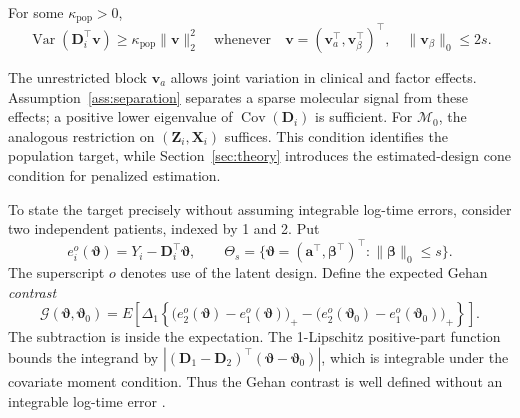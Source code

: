 \begin{assumption}
\label{ass:separation}
For some $\kappa_{\mathrm{pop}}>0$,
\begin{equation}
 \operatorname{Var}(\bm{D}_i^\top \bm{v})\ge\kappa_{\mathrm{pop}}\|\bm{v}\|_2^2
 \quad\text{whenever}\quad
 \bm{v}=(\bm{v}_a^\top,\bm{v}_\beta^\top)^\top,\quad \|\bm{v}_\beta\|_0\le 2s.
 \label{eq:population-separation}
\end{equation}
\end{assumption}
The unrestricted block $\bm{v}_a$ allows joint variation in clinical and factor effects. Assumption~\ref{ass:separation} separates a sparse molecular signal from these effects; a positive lower eigenvalue of $\operatorname{Cov}(\bm{D}_i)$ is sufficient. For $\mathcal M_0$, the analogous restriction on $(\bm{Z}_i,\bm{X}_i)$ suffices. This condition identifies the population target, while Section~\ref{sec:theory} introduces the estimated-design cone condition for penalized estimation.

To state the target precisely without assuming integrable log-time errors, consider two independent patients, indexed by 1 and 2. Put
\[
 e_i^o(\bm{\vartheta})=Y_i-\bm{D}_i^\top\bm{\vartheta},\qquad
 \Theta_s=\{\bm{\vartheta}=(\bm{a}^\top,\bm{\beta}^\top)^\top:\|\bm{\beta}\|_0\le s\}.
\]
The superscript $o$ denotes use of the latent design. Define the expected Gehan \emph{contrast}
\begin{equation}
 \mathcal G(\bm{\vartheta},\bm{\vartheta}_0)
 =E\!\left[\Delta_1
 \left\{\bigl(e_2^o(\bm{\vartheta})-e_1^o(\bm{\vartheta})\bigr)_+
        -\bigl(e_2^o(\bm{\vartheta}_0)-e_1^o(\bm{\vartheta}_0)\bigr)_+\right\}\right].
 \label{eq:oracle-contrast}
\end{equation}
The subtraction is inside the expectation. The 1-Lipschitz positive-part function bounds the integrand by $|(\bm{D}_1-\bm{D}_2)^\top(\bm{\vartheta}-\bm{\vartheta}_0)|$, which is integrable under the covariate moment condition. Thus the Gehan contrast is well defined without an integrable log-time error \citep{CaiEtAl2009,SuderMolstad2022}.

